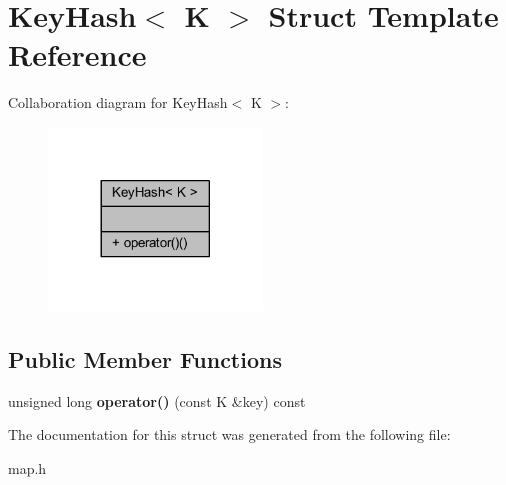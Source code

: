 \hypertarget{struct_key_hash}{}\section{Key\+Hash$<$ K $>$ Struct Template Reference}
\label{struct_key_hash}


Collaboration diagram for Key\+Hash$<$ K $>$\+:
\nopagebreak
\begin{figure}[H]
\begin{center}
\leavevmode
\includegraphics[width=161pt]{struct_key_hash__coll__graph}
\end{center}
\end{figure}
\subsection*{Public Member Functions}
\begin{DoxyCompactItemize}
\item 
\mbox{\label{struct_key_hash_a35aecf817e0734515ca84ec397465a58}} 
unsigned long {\bfseries operator()} (const K \&key) const
\end{DoxyCompactItemize}


The documentation for this struct was generated from the following file\+:\begin{DoxyCompactItemize}
\item 
map.\+h\end{DoxyCompactItemize}
